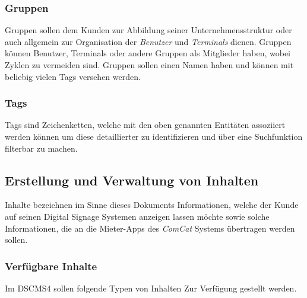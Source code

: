 \documentclass[a4paper]{article}
\begin{document}
	\subsubsection{Gruppen}
	Gruppen sollen dem Kunden zur Abbildung seiner Unternehmensstruktur oder auch allgemein zur Organisation der \emph{Benutzer} und \emph{Terminals} dienen.
	Gruppen können Benutzer, Terminals oder andere Gruppen als Mitglieder haben, wobei Zyklen zu vermeiden sind.
	Gruppen sollen einen Namen haben und können mit beliebig vielen Tags versehen werden.
	\subsubsection{Tags}
	Tags sind Zeichenketten, welche mit den oben genannten Entitäten assoziiert werden können um diese detaillierter zu identifizieren und über eine Suchfunktion filterbar zu machen.
	\subsection{Erstellung und Verwaltung von Inhalten}
	Inhalte bezeichnen im Sinne dieses Dokuments Informationen, welche der Kunde auf seinen Digital Signage Systemen anzeigen lassen möchte sowie solche Informationen, die an die Mieter-Apps des \emph{ComCat} Systems übertragen werden sollen.
	\subsubsection{Verfügbare Inhalte}
	Im DSCMS4 sollen folgende Typen von Inhalten Zur Verfügung gestellt werden.
\end{document}
